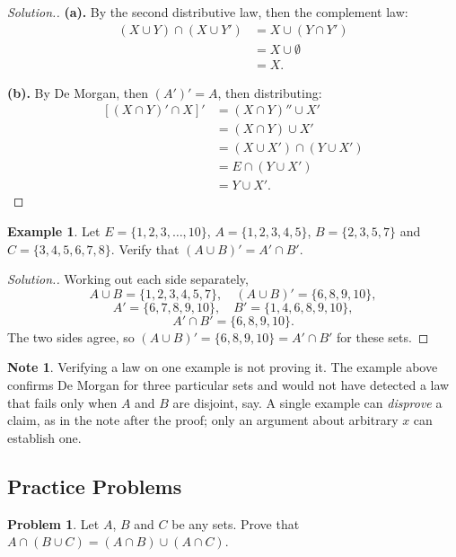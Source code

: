 \documentclass[11pt,a4paper]{article}
\theoremstyle{definition}
\newtheorem{example}[thm]{Example}
\newtheorem{note}[thm]{Note}
\newtheorem{problemx}{Problem}[section]
\newenvironment{problem}{\begin{problemx}}{\end{problemx}}
\newenvironment{solution}
  {\renewcommand{\qedsymbol}{}\begin{proof}[\textit{Solution}.]}
  {\end{proof}}
\begin{document}
\begin{solution}
\textbf{(a).} By the second distributive law, then the complement law:
\begin{align*}
(X\cup Y)\cap(X\cup Y') &= X\cup(Y\cap Y')\\
                        &= X\cup\emptyset\\
                        &= X .
\end{align*}

\textbf{(b).} By De Morgan, then $(A')'=A$, then distributing:
\begin{align*}
\left[(X\cap Y)'\cap X\right]' &= (X\cap Y)''\cup X'\\
                               &= (X\cap Y)\cup X'\\
                               &= (X\cup X')\cap(Y\cup X')\\
                               &= E\cap(Y\cup X')\\
                               &= Y\cup X' .
\end{align*}
\end{solution}

\begin{example}
Let $E=\{1,2,3,\dots,10\}$, $A=\{1,2,3,4,5\}$, $B=\{2,3,5,7\}$ and
$C=\{3,4,5,6,7,8\}$. Verify that $(A\cup B)'=A'\cap B'$.
\end{example}

\begin{solution}
Working out each side separately,
$$A\cup B=\{1,2,3,4,5,7\},\quad (A\cup B)'=\{6,8,9,10\},$$
$$A'=\{6,7,8,9,10\},\quad B'=\{1,4,6,8,9,10\},$$
$$A'\cap B'=\{6,8,9,10\}.$$
The two sides agree, so $(A\cup B)'=\{6,8,9,10\}=A'\cap B'$ for these sets.
\end{solution}

\begin{note}
Verifying a law on one example is not proving it. The example above confirms De
Morgan for three particular sets and would not have detected a law that fails only
when $A$ and $B$ are disjoint, say. A single example can \emph{disprove} a claim,
as in the note after the proof; only an argument about arbitrary $x$ can establish
one.
\end{note}

\subsection{Practice Problems}

\begin{problem}
Let $A$, $B$ and $C$ be any sets. Prove that
$A\cap(B\cup C)=(A\cap B)\cup(A\cap C)$.
\end{problem}
\end{document}

